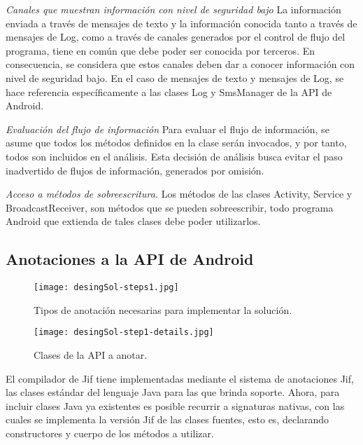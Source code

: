 \textit{Canales que muestran información con nivel de seguridad bajo}\newline
La información enviada a través de mensajes de texto y la información conocida
tanto a través de mensajes de Log, como a través de canales generados por el
control de flujo del programa, tiene en común que debe poder ser conocida por
terceros. En consecuencia, se considera que estos canales deben dar a conocer
información con nivel de seguridad bajo.\newline
En el caso de mensajes de texto y mensajes de Log, se hace referencia
específicamente a las clases Log y SmsManager de la API de Android.

\textit{Evaluación del flujo de información}\newline
Para evaluar el flujo de información, se asume que todos los métodos definidos
en la clase serán invocados, y por tanto, todos son incluidos en el análisis.\newline 
Esta decisión de análisis busca evitar el paso inadvertido de flujos de
información, generados por omisión.

\textit{Acceso a métodos de sobreescritura.}\newline
Los métodos de las clases Activity, Service y BroadcastReceiver, son métodos
que se pueden sobreescribir, todo programa Android que extienda de tales clases
debe poder utilizarlos.

\subsection{Anotaciones a la API de Android}
\label{subsec:apiAnnotations}

\begin{figure}[h!]
	\begin{center}
	\texttt{[image: desingSol-steps1.jpg]}
	\end{center}
	\caption{Tipos de anotación necesarias para implementar la solución.}
	\label{fig:desingSol-steps1}
\end{figure}

\begin{figure}[t!]
	\begin{center}
	\texttt{[image: desingSol-step1-details.jpg]}
	\end{center}
	\caption{Clases de la API a anotar.}
	\label{fig:desingSol-details}
\end{figure}

El compilador de Jif tiene implementadas mediante el sistema de anotaciones Jif,
las clases estándar del lenguaje Java para las que brinda soporte.\newline
Ahora, para incluir clases Java ya existentes es posible recurrir a signaturas
nativas, con las cuales se implementa la versión Jif de las clases fuentes, esto
es, declarando constructores y cuerpo de los métodos a utilizar.

